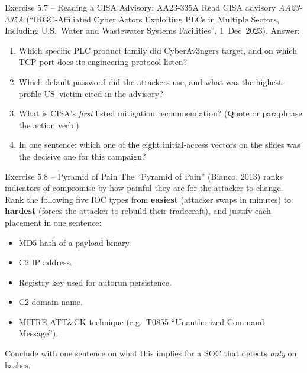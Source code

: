 \documentclass[11pt,a4paper]{article}
\begin{document}
\begin{taskbox}{Exercise 5.7 -- Reading a CISA Advisory: AA23-335A}
Read CISA advisory \emph{AA23-335A} (``IRGC-Affiliated Cyber Actors Exploiting PLCs in Multiple
Sectors, Including U.S.\ Water and Wastewater Systems Facilities'', 1~Dec~2023). Answer:
\begin{enumerate}\setlength{\itemsep}{0pt}
  \item Which specific PLC product family did CyberAv3ngers target, and on which TCP port does
        its engineering protocol listen?
  \item Which default password did the attackers use, and what was the highest-profile
        US~victim cited in the advisory?
  \item What is CISA's \emph{first} listed mitigation recommendation? (Quote or paraphrase the
        action verb.)
  \item In one sentence: which one of the eight initial-access vectors on the slides was the
        decisive one for this campaign?
\end{enumerate}
\end{taskbox}

\begin{taskbox}{Exercise 5.8 -- Pyramid of Pain}
The ``Pyramid of Pain'' (Bianco, 2013) ranks indicators of compromise by how painful they are
for the attacker to change. Rank the following five IOC types from \textbf{easiest} (attacker
swaps in minutes) to \textbf{hardest} (forces the attacker to rebuild their tradecraft), and
justify each placement in one sentence:
\begin{itemize}\setlength{\itemsep}{0pt}
  \item MD5 hash of a payload binary.
  \item C2 IP address.
  \item Registry key used for autorun persistence.
  \item C2 domain name.
  \item MITRE ATT\&CK technique (e.g.\ T0855 ``Unauthorized Command Message'').
\end{itemize}
Conclude with one sentence on what this implies for a SOC that detects \emph{only} on hashes.
\end{taskbox}
\end{document}
